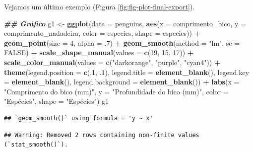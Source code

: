 \documentclass[
]{article}
\newenvironment{Shaded}{\begin{snugshade}}{\end{snugshade}}
\newcommand{\AttributeTok}[1]{\textcolor[rgb]{0.13,0.29,0.53}{#1}}
\newcommand{\ConstantTok}[1]{\textcolor[rgb]{0.56,0.35,0.01}{#1}}
\newcommand{\DecValTok}[1]{\textcolor[rgb]{0.00,0.00,0.81}{#1}}
\newcommand{\DocumentationTok}[1]{\textcolor[rgb]{0.56,0.35,0.01}{\textbf{\textit{#1}}}}
\newcommand{\FunctionTok}[1]{\textcolor[rgb]{0.13,0.29,0.53}{\textbf{#1}}}
\newcommand{\NormalTok}[1]{#1}
\newcommand{\OtherTok}[1]{\textcolor[rgb]{0.56,0.35,0.01}{#1}}
\newcommand{\SpecialCharTok}[1]{\textcolor[rgb]{0.81,0.36,0.00}{\textbf{#1}}}
\newcommand{\StringTok}[1]{\textcolor[rgb]{0.31,0.60,0.02}{#1}}
\begin{document}
Vejamos um último exemplo (Figura \ref{fig:fig-plot-final-export}).

\begin{Shaded}
\begin{Highlighting}[]
\DocumentationTok{\#\# Gráfico}
\NormalTok{g1 }\OtherTok{\textless{}{-}} \FunctionTok{ggplot}\NormalTok{(}\AttributeTok{data =}\NormalTok{ penguins, }
             \FunctionTok{aes}\NormalTok{(}\AttributeTok{x =}\NormalTok{ comprimento\_bico, }\AttributeTok{y =}\NormalTok{ comprimento\_nadadeira,}
                 \AttributeTok{color =}\NormalTok{ especies, }\AttributeTok{shape =}\NormalTok{ especies)) }\SpecialCharTok{+}
    \FunctionTok{geom\_point}\NormalTok{(}\AttributeTok{size =} \DecValTok{4}\NormalTok{, }\AttributeTok{alpha =}\NormalTok{ .}\DecValTok{7}\NormalTok{) }\SpecialCharTok{+}
    \FunctionTok{geom\_smooth}\NormalTok{(}\AttributeTok{method =} \StringTok{"lm"}\NormalTok{, }\AttributeTok{se =} \ConstantTok{FALSE}\NormalTok{) }\SpecialCharTok{+}
    \FunctionTok{scale\_shape\_manual}\NormalTok{(}\AttributeTok{values =} \FunctionTok{c}\NormalTok{(}\DecValTok{19}\NormalTok{, }\DecValTok{15}\NormalTok{, }\DecValTok{17}\NormalTok{)) }\SpecialCharTok{+}
    \FunctionTok{scale\_color\_manual}\NormalTok{(}\AttributeTok{values =} \FunctionTok{c}\NormalTok{(}\StringTok{"darkorange"}\NormalTok{, }\StringTok{"purple"}\NormalTok{, }\StringTok{"cyan4"}\NormalTok{)) }\SpecialCharTok{+}
    \FunctionTok{theme}\NormalTok{(}\AttributeTok{legend.position =} \FunctionTok{c}\NormalTok{(.}\DecValTok{1}\NormalTok{, .}\DecValTok{1}\NormalTok{),}
          \AttributeTok{legend.title =} \FunctionTok{element\_blank}\NormalTok{(),}
          \AttributeTok{legend.key =}  \FunctionTok{element\_blank}\NormalTok{(),}
          \AttributeTok{legend.background =} \FunctionTok{element\_blank}\NormalTok{()) }\SpecialCharTok{+}
    \FunctionTok{labs}\NormalTok{(}\AttributeTok{x =} \StringTok{"Comprimento do bico (mm)"}\NormalTok{, }\AttributeTok{y =} \StringTok{"Profundidade do bico (mm)"}\NormalTok{, }
         \AttributeTok{color =} \StringTok{"Espécies"}\NormalTok{, }\AttributeTok{shape =} \StringTok{"Espécies"}\NormalTok{)}
\NormalTok{g1}
\end{Highlighting}
\end{Shaded}

\begin{verbatim}
## `geom_smooth()` using formula = 'y ~ x'
\end{verbatim}

\begin{verbatim}
## Warning: Removed 2 rows containing non-finite values (`stat_smooth()`).
\end{verbatim}
\end{document}
